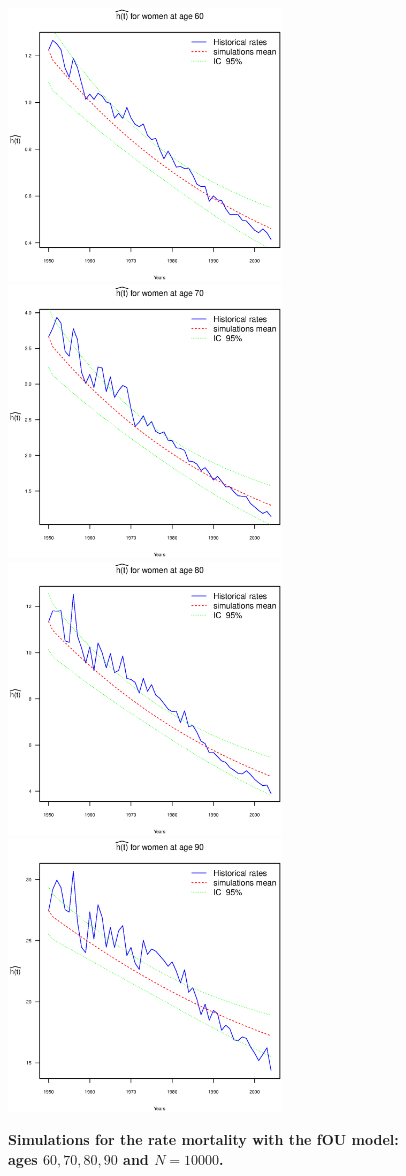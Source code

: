 \documentclass[smallextended]{svjour3}
\begin{document}
\begin{figure}[htb]
    \includegraphics[width = 2.85in]{PlotWomen60.eps}
    \includegraphics[width = 2.85in]{PlotWomen70.eps}
    \includegraphics[width = 2.85in]{PlotWomen80.eps}
    \includegraphics[width = 2.85in]{PlotWomen90.eps}
    \caption{\bf Simulations for the rate mortality with the fOU model: ages
    $60,70,80,90$ and $N=10000$.}
    \label{graph-simu_FOU2}
\end{figure}\vspace*{0.1cm}
\end{document}
